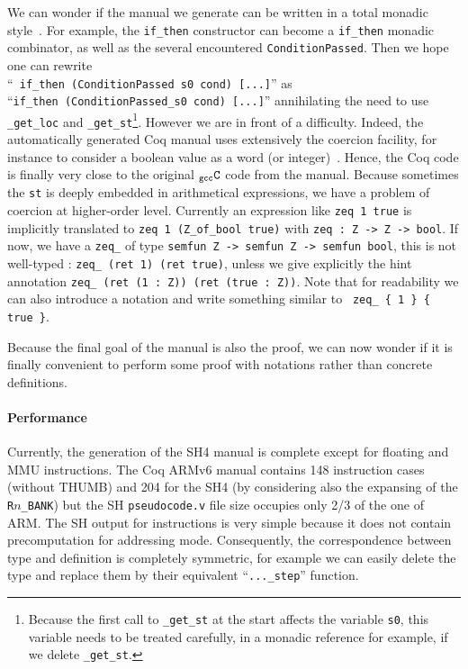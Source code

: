 \documentclass[a4paper, 11pt]{article}
\newcommand{\gccC}{$_{\tt gcc}{\tt C}$\xspace}
\begin{document}
\hspace{1ex}

We can wonder if the manual we generate can be written in a total monadic style~\cite{conf/itp/FoxM10}. For example, the \verb|if_then| constructor can become a \verb|if_then| monadic combinator, as well as the several encountered \verb|ConditionPassed|. Then we hope one can rewrite \\
``{\tt <s0> if\_then (ConditionPassed s0 cond) [...]}'' as \\
 ``{\tt if\_then (ConditionPassed\_s0 cond) [...]}'' annihilating the need to use \verb|_get_loc| and \verb|_get_st|\footnote{Because the first call to {\tt \_get\_st} at the start affects the variable {\tt s0}, this variable needs to be treated carefully, in a monadic reference for example, if we delete {\tt \_get\_st}.}. However we are in front of a difficulty. Indeed, the automatically generated Coq manual uses extensively the coercion facility, for instance to consider a boolean value as a word (or integer)~\cite{arm}. Hence, the Coq code is finally very close to the original \gccC code from the manual. Because sometimes the \verb|st| is deeply embedded in arithmetical expressions, we 
have a problem of coercion at higher-order level. Currently an
expression like
\verb|zeq 1 true| is implicitly translated to \verb|zeq 1 (Z_of_bool true)|
with \verb|zeq : Z -> Z -> bool|.
If now, we have a \verb|zeq_| of type \verb|semfun Z -> semfun Z -> semfun bool|,
this is not well-typed :
\verb|zeq_ (ret 1) (ret true)|,
unless we give explicitly the hint annotation
\verb|zeq_ (ret (1 : Z)) (ret (true : Z))|.
Note that for readability we can also introduce a notation and write
something similar to \verb| zeq_ { 1 } { true }|.

Because the final goal of the manual is also the proof, we can now wonder if it is finally convenient to perform some proof with notations rather than concrete definitions.

\paragraph{Performance}
Currently, the generation of the SH4 manual is complete except for floating and MMU instructions. The Coq ARMv6 manual contains 148 instruction cases (without THUMB) and 204 for the SH4 (by considering also the expansing of the \verb|R|$n$\verb|_BANK|) but the SH {\tt pseudocode.v} file size occupies only 2/3 of the one of ARM. The SH output for instructions is very simple because it does not contain precomputation for addressing mode. Consequently, the correspondence between type and definition is completely symmetric, for example we can easily delete the type and replace them by their equivalent ``\verb|..._step|'' function.
\end{document}

